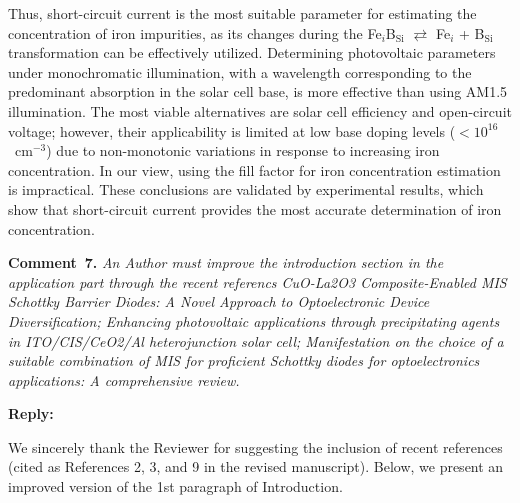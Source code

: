 \documentclass[a4paper,fleqn]{cas-sc}
\begin{document}
\begin{mdframed}
Thus, short-circuit current is the most suitable parameter for estimating the concentration of iron impurities, as its changes during the
Fe$_i$B$_\mathrm{Si}$ $\rightleftarrows$ Fe$_i$ + B$_\mathrm{Si}$ transformation can be effectively utilized.
Determining photovoltaic parameters under monochromatic illumination,
with a wavelength corresponding to the predominant absorption in the solar cell base, is more effective than using AM1.5 illumination.
The most viable alternatives are solar cell efficiency and open-circuit voltage;
however, their applicability is limited at low base doping levels ($<10^{16}$~cm$^{-3}$)
due to non-monotonic variations in response to increasing iron concentration.
In our view, using the fill factor for iron concentration estimation is impractical.
\textcolor[rgb]{1.00,0.07,0.00}{These conclusions are validated by experimental results, 
which show that short-circuit current provides the most accurate determination of iron concentration.}
\end{mdframed}

\vspace{1cm}
\noindent
\textcolor[rgb]{0.00,0.50,1.00}{\textbf{Comment~7.}}
\emph{An Author must improve the introduction section in the application part through the recent referencs
CuO-La2O3 Composite-Enabled MIS Schottky Barrier Diodes: A Novel Approach to Optoelectronic Device Diversification;
Enhancing photovoltaic applications through precipitating agents in ITO/CIS/CeO2/Al heterojunction solar cell;
Manifestation on the choice of a suitable combination of MIS for proficient Schottky diodes for optoelectronics applications: A comprehensive review.}






\noindent
\textcolor[rgb]{0.51,0.00,0.00}{\textbf{Reply:}}

We sincerely thank the Reviewer for suggesting the inclusion of recent references (cited as References 2, 3, and 9 in the revised manuscript).
Below, we present an improved version of the 1st paragraph of Introduction.
\end{document}
